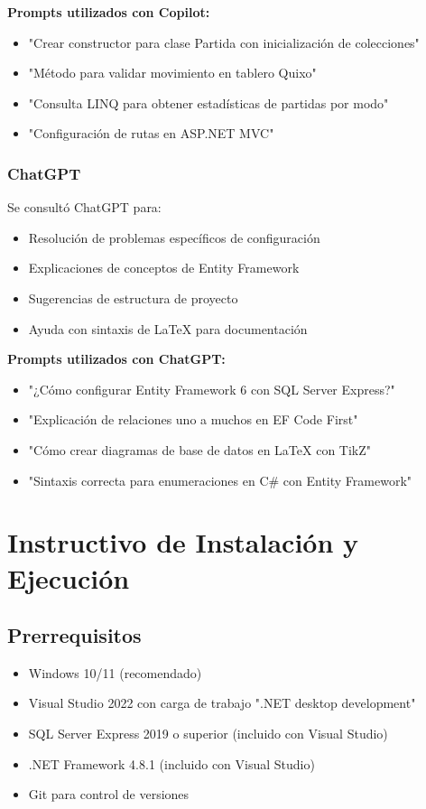 \documentclass[12pt]{article}
\begin{document}
\textbf{Prompts utilizados con Copilot:}
\begin{itemize}
    \item "Crear constructor para clase Partida con inicialización de colecciones"
    \item "Método para validar movimiento en tablero Quixo"
    \item "Consulta LINQ para obtener estadísticas de partidas por modo"
    \item "Configuración de rutas en ASP.NET MVC"
\end{itemize}

\subsubsection*{ChatGPT}
Se consultó ChatGPT para:
\begin{itemize}
    \item Resolución de problemas específicos de configuración
    \item Explicaciones de conceptos de Entity Framework
    \item Sugerencias de estructura de proyecto
    \item Ayuda con sintaxis de LaTeX para documentación
\end{itemize}

\textbf{Prompts utilizados con ChatGPT:}
\begin{itemize}
    \item "¿Cómo configurar Entity Framework 6 con SQL Server Express?"
    \item "Explicación de relaciones uno a muchos en EF Code First"
    \item "Cómo crear diagramas de base de datos en LaTeX con TikZ"
    \item "Sintaxis correcta para enumeraciones en C\# con Entity Framework"
\end{itemize}

\section*{Instructivo de Instalación y Ejecución}

\subsection*{Prerrequisitos}
\begin{itemize}
    \item Windows 10/11 (recomendado)
    \item Visual Studio 2022 con carga de trabajo ".NET desktop development"
    \item SQL Server Express 2019 o superior (incluido con Visual Studio)
    \item .NET Framework 4.8.1 (incluido con Visual Studio)
    \item Git para control de versiones
\end{itemize}
\end{document}
